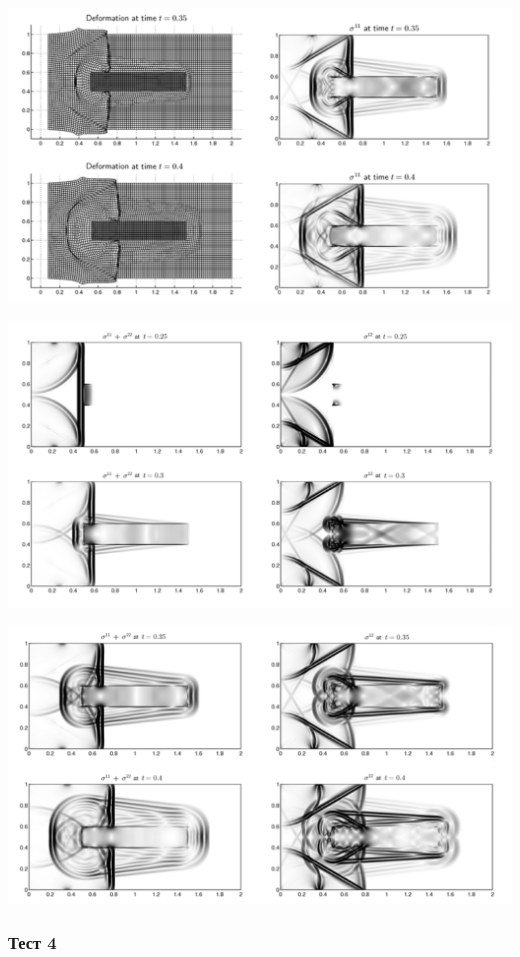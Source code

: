 \documentclass{article}
\begin{document}
\includegraphics[scale=0.35]{2D_seismic_tests/inclusion2.png}

\includegraphics[scale=0.35]{2D_seismic_tests/inclusion3.png}

\includegraphics[scale=0.35]{2D_seismic_tests/inclusion4.png}

\newpage
\subsubsection{Тест 4}
\end{document}
